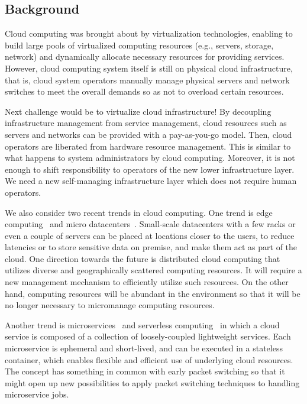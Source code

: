 \subsection{Background}

Cloud computing was brought about by virtualization technologies,
enabling to build large pools of virtualized computing resources (e.g.,
servers, storage, network) and dynamically allocate necessary resources
for providing services.
However, cloud computing system itself is still on physical cloud
infrastructure, that is, cloud system operators manually manage
physical servers and network switches to meet the overall demands
so as not to overload certain resources.

Next challenge would be to virtualize cloud infrastructure!
By decoupling infrastructure management from service management,
cloud resources such as servers and networks can be provided with a
pay-as-you-go model.
Then, cloud operators are liberated from hardware resource management.
This is similar to what happens to system administrators by cloud
computing.
Moreover, it is not enough to shift responsibility to operators of the
new lower infrastructure layer. We need a new self-managing
infrastructure layer which does not require human operators.

We also consider two recent trends in cloud computing.
One trend is edge computing~\cite{Lopez-2015} and
micro datacenters~\cite{Greenberg-2009}.
Small-scale datacenters with a few racks or even a couple of servers
can be placed at locations closer to the users, to reduce latencies
or to store sensitive data on premise, and make them act as part of
the cloud.
One direction towards the future is distributed cloud computing that
utilizes diverse and geographically scattered computing resources.
It will require a new management mechanism to efficiently utilize such
resources.
On the other hand, computing resources will be abundant in the
environment so that it will be no longer necessary to micromanage
computing resources.

Another trend is microservices~\cite{nadareishvili2016microservice}
and serverless computing~\cite{Shafiei-2022} in which
a cloud service is composed of a collection of loosely-coupled
lightweight services.
Each microservice is ephemeral and short-lived, and can be executed
in a stateless container,
which enables flexible and efficient use of underlying cloud
resources.
The concept has something in common with early packet switching so
that it might open up new possibilities to apply packet switching
techniques to handling microservice jobs.

